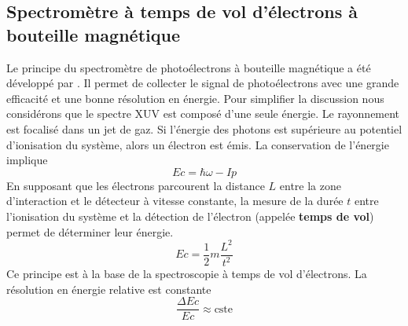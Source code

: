 \subsection{Spectromètre à temps de vol d'électrons à bouteille magnétique}
Le principe du spectromètre de photoélectrons à bouteille magnétique a été développé par . Il permet de collecter le signal de photoélectrons avec une grande efficacité et une bonne résolution en énergie. Pour simplifier la discussion nous considérons que le spectre XUV est composé d'une seule énergie. Le rayonnement est focalisé dans un jet de gaz. Si l'énergie des photons est supérieure au potentiel d'ionisation du système, alors un électron est émis. La conservation de l'énergie implique
\begin{equation}
Ec = \hbar \omega - Ip 
\end{equation}
En supposant que les électrons parcourent la distance $L$ entre la zone d'interaction et le détecteur à vitesse constante, la mesure de la durée $t$ entre l'ionisation du système et la détection de l'électron (appelée \textbf{temps de vol}) permet de déterminer leur énergie.
\begin{equation}
Ec = \frac {1}{2}m \frac{L^2}{t^2}
\end{equation}
Ce principe est à la base de la spectroscopie à temps de vol d'électrons. La résolution en énergie relative est constante
\begin{equation}
\frac{\Delta Ec}{Ec} \approx \text{cste}
\end{equation}
